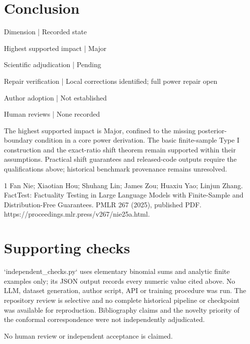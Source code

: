\documentclass[10pt]{article}
\begin{document}
\section*{Conclusion}
Dimension | Recorded state\par
Highest supported impact | Major\par
Scientific adjudication | Pending\par
Repair verification | Local corrections identified; full power repair open\par
Author adoption | Not established\par
Human reviews | None recorded\par
The highest supported impact is Major, confined to the missing posterior-boundary condition in a core power derivation. The basic finite-sample Type I construction and the exact-ratio shift theorem remain supported within their assumptions. Practical shift guarantees and released-code outputs require the qualifications above; historical benchmark provenance remains unresolved.\par
1 Fan Nie; Xiaotian Hou; Shuhang Lin; James Zou; Huaxiu Yao; Linjun Zhang. FactTest: Factuality Testing in Large Language Models with Finite-Sample and Distribution-Free Guarantees. PMLR 267 (2025), published PDF. https://proceedings.mlr.press/v267/nie25a.html.\par
\section*{Supporting checks}
`independent\_checks.py` uses elementary binomial sums and analytic finite examples only; its JSON output records every numeric value cited above. No LLM, dataset generation, author script, API or training procedure was run. The repository review is selective and no complete historical pipeline or checkpoint was available for reproduction. Bibliography claims and the novelty priority of the conformal correspondence were not independently adjudicated.\par
No human review or independent acceptance is claimed.\par
\end{document}
